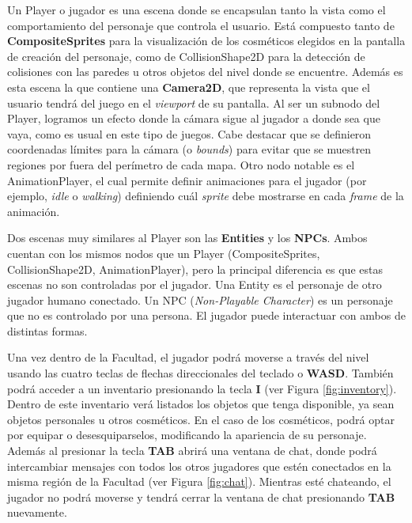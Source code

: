Un Player o jugador es una escena donde se encapsulan tanto la vista como el comportamiento del
personaje que controla el usuario. Está compuesto tanto de \textbf{CompositeSprites} para la visualización
de los cosméticos elegidos en la pantalla de creación del personaje, como de CollisionShape2D para
la detección de colisiones con las paredes u otros objetos del nivel donde se encuentre.
Además es esta escena la que contiene una \textbf{Camera2D}, que representa la vista que el usuario tendrá
del juego en el \textit{viewport} de su pantalla. Al ser un subnodo del Player, logramos un efecto donde la
cámara sigue al jugador a donde sea que vaya, como es usual en este tipo de juegos. Cabe destacar que se 
definieron coordenadas límites para la cámara (o \textit{bounds}) para evitar que se muestren regiones por
fuera del perímetro de cada mapa.
Otro nodo notable es el AnimationPlayer, el cual permite definir animaciones para el jugador
(por ejemplo, \textit{idle} o \textit{walking}) definiendo cuál \textit{sprite} debe mostrarse en cada
\textit{frame} de la animación.

Dos escenas muy similares al Player son las \textbf{Entities} y los \textbf{NPCs}.
Ambos cuentan con los mismos nodos que un Player (CompositeSprites, CollisionShape2D, AnimationPlayer),
pero la principal diferencia es que estas escenas no son controladas por el jugador.
Una Entity es el personaje de otro jugador humano conectado. Un NPC (\textit{Non-Playable Character})
es un personaje que no es controlado por una persona. El jugador puede interactuar
con ambos de distintas formas.

Una vez dentro de la Facultad, el jugador podrá moverse a través del nivel usando las cuatro teclas de flechas
direccionales del teclado o \textbf{WASD}.
También podrá acceder a un inventario presionando la tecla \textbf{I} (ver Figura \ref{fig:inventory}).
Dentro de este inventario verá listados los objetos que tenga disponible, ya sean objetos personales u otros
cosméticos. En el caso de los cosméticos, podrá optar por equipar o desesquiparselos, modificando la
apariencia de su personaje.
Además al presionar la tecla \textbf{TAB} abrirá una ventana de chat, donde podrá intercambiar mensajes con
todos los otros jugadores que estén conectados en la misma región de la Facultad (ver Figura \ref{fig:chat}).
Mientras esté chateando, el jugador no podrá moverse y tendrá cerrar la ventana de chat presionando \textbf{TAB} nuevamente.


